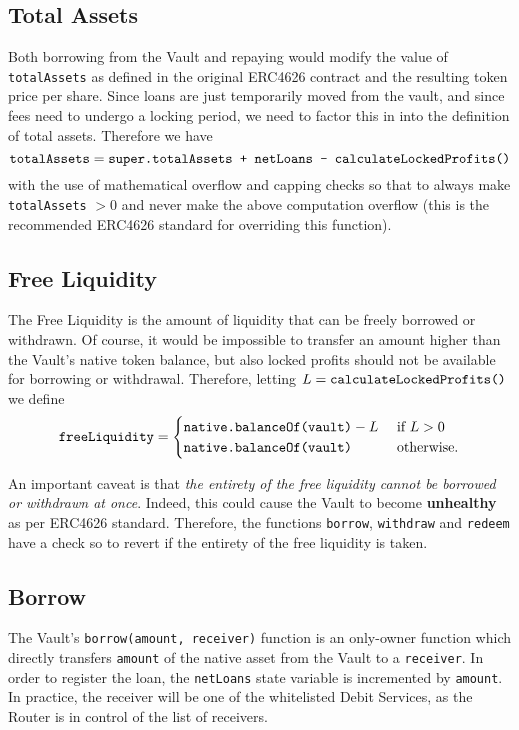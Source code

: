 \documentclass[a4paper,10 pt]{article}
\theoremstyle{definition}
\begin{document}
\subsection{Total Assets}\label{totalAssetsSub}

Both borrowing from the Vault and repaying would modify the value of \verb|totalAssets| as defined in the original ERC4626 contract and the resulting token price per share. Since loans are just temporarily moved from the vault, and since fees need to undergo a locking period, we need to factor this in into the definition of total assets. Therefore we have $$\verb|totalAssets| = \verb|super.totalAssets + netLoans - calculateLockedProfits()|$$ with the use of mathematical overflow and capping checks so that to always make \verb|totalAssets| $> 0$ and never make the above computation overflow (this is the recommended ERC4626 standard for overriding this function).

\subsection{Free Liquidity}\label{freeLiquidity}

The Free Liquidity is the amount of liquidity that can be freely borrowed or withdrawn. Of course, it would be impossible to transfer an amount higher than the Vault's native token balance, but also locked profits should not be available for borrowing or withdrawal. Therefore, letting $L = \verb|calculateLockedProfits()|$ we define
$$\verb|freeLiquidity| = \begin{cases}
\verb|native.balanceOf(vault)| - L &\text{ if } L > 0 \\

\verb|native.balanceOf(vault)| &\text{ otherwise}.
\end{cases} $$

An important caveat is that {\it the entirety of the free liquidity cannot be borrowed or withdrawn at once}. Indeed, this could cause the Vault to become {\bf unhealthy} as per ERC4626 standard. Therefore, the functions \verb|borrow|, \verb|withdraw| and \verb|redeem| have a check so to revert if the entirety of the free liquidity is taken. 
\subsection{Borrow}\label{borrowSub}

The Vault's \verb|borrow(amount, receiver)| function is an only-owner function which directly transfers \verb|amount| of the native asset from the Vault to a \verb|receiver|. In order to register the loan, the \verb|netLoans| state variable is incremented by \verb|amount|. In practice, the receiver will be one of the whitelisted Debit Services, as the Router is in control of the list of receivers.
\end{document}
